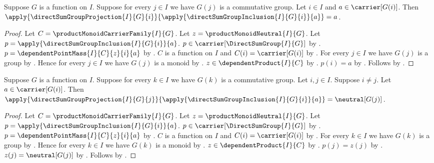\begin{proposition}\label{direct_sum_group_projection_inclusion_selected}
    Suppose $G$ is a function on $I$.
    Suppose for every $j\in I$ we have $G(j)$ is a commutative group.
    Let $i\in I$ and $a\in\carrier[G(i)]$.
    Then
        $\apply{\directSumGroupProjection{I}{G}{i}}{
            \apply{\directSumGroupInclusion{I}{G}{i}}{a}}=a$.
\end{proposition}
\begin{proof}
    Let $C=\productMonoidCarrierFamily{I}{G}$.
    Let $z=\productMonoidNeutral{I}{G}$.
    Let $p=\apply{\directSumGroupInclusion{I}{G}{i}}{a}$.
    $p\in\carrier[\DirectSumGroup{I}{G}]$ by
        .
    $p=\dependentPointMass{I}{C}{z}{i}{a}$ by
        .
    $C$ is a function on $I$ and $C(i)=\carrier[G(i)]$ by
        .
    For every $j\in I$ we have $G(j)$ is a group by
        .
    Hence for every $j\in I$ we have $G(j)$ is a monoid by
        .
    $z\in\dependentProduct{I}{C}$ by
        .
    $p(i)=a$ by .
    Follows by .
\end{proof}

\begin{proposition}\label{direct_sum_group_projection_inclusion_other}
    Suppose $G$ is a function on $I$.
    Suppose for every $k\in I$ we have $G(k)$ is a commutative group.
    Let $i,j\in I$.
    Suppose $i\neq j$.
    Let $a\in\carrier[G(i)]$.
    Then
        $\apply{\directSumGroupProjection{I}{G}{j}}{
            \apply{\directSumGroupInclusion{I}{G}{i}}{a}}
            =\neutral[G(j)]$.
\end{proposition}
\begin{proof}
    Let $C=\productMonoidCarrierFamily{I}{G}$.
    Let $z=\productMonoidNeutral{I}{G}$.
    Let $p=\apply{\directSumGroupInclusion{I}{G}{i}}{a}$.
    $p\in\carrier[\DirectSumGroup{I}{G}]$ by
        .
    $p=\dependentPointMass{I}{C}{z}{i}{a}$ by
        .
    $C$ is a function on $I$ and $C(i)=\carrier[G(i)]$ by
        .
    For every $k\in I$ we have $G(k)$ is a group by
        .
    Hence for every $k\in I$ we have $G(k)$ is a monoid by
        .
    $z\in\dependentProduct{I}{C}$ by
        .
    $p(j)=z(j)$ by .
    $z(j)=\neutral[G(j)]$ by
        .
    Follows by .
\end{proof}

